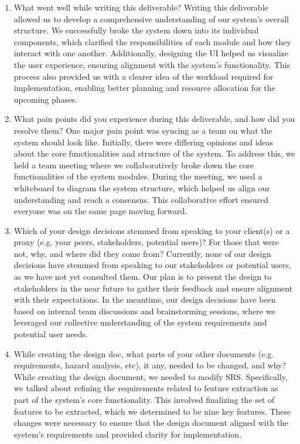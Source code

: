 \documentclass[12pt, titlepage]{article}
\begin{document}
\begin{enumerate}
  \item What went well while writing this deliverable?
  Writing this deliverable allowed us to develop a comprehensive understanding of our system's overall structure. We successfully broke the system down into its individual components, which clarified the responsibilities of each module and how they interact with one another. Additionally, designing the UI helped us visualize the user experience, ensuring alignment with the system's functionality. This process also provided us with a clearer idea of the workload required for implementation, enabling better planning and resource allocation for the upcoming phases.

  \item What pain points did you experience during this deliverable, and how
    did you resolve them?
    One major pain point was syncing as a team on what the system should look like. Initially, there were differing opinions and ideas about the core functionalities and structure of the system. To address this, we held a team meeting where we collaboratively broke down the core functionalities of the system modules. During the meeting, we used a whiteboard to diagram the system structure, which helped us align our understanding and reach a consensus. This collaborative effort ensured everyone was on the same page moving forward.
  \item Which of your design decisions stemmed from speaking to your client(s)
  or a proxy (e.g. your peers, stakeholders, potential users)? For those that
  were not, why, and where did they come from?
  Currently, none of our design decisions have stemmed from speaking to our stakeholders or potential users, as we have not yet consulted them. Our plan is to present the design to stakeholders in the near future to gather their feedback and ensure alignment with their expectations. In the meantime, our design decisions have been based on internal team discussions and brainstorming sessions, where we leveraged our collective understanding of the system requirements and potential user needs.
  \item While creating the design doc, what parts of your other documents (e.g.
  requirements, hazard analysis, etc), it any, needed to be changed, and why?
  While creating the design document, we needed to modify SRS. Specifically, we talked about refining the requirements related to feature extraction as part of the system’s core functionality. This involved finalizing the set of features to be extracted, which we determined to be nine key features. These changes were necessary to ensure that the design document aligned with the system’s requirements and provided clarity for implementation.


\end{enumerate}
\end{document}
